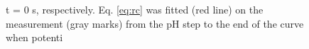 \documentclass[3p]{elsarticle}
\begin{document}
\begin{figure}
{t = 0 s, respectively.
Eq. \ref{eq:rc} was fitted (red line) on the measurement (gray marks) from the pH step to the end of the curve when potenti}
\end{figure}
\end{document}
